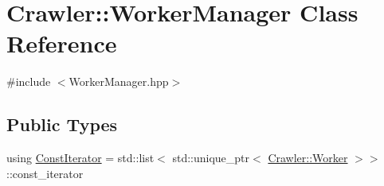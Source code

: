 \hypertarget{class_crawler_1_1_worker_manager}{}\section{Crawler\+:\+:Worker\+Manager Class Reference}
\label{class_crawler_1_1_worker_manager}


{\ttfamily \#include $<$Worker\+Manager.\+hpp$>$}

\subsection*{Public Types}
\begin{DoxyCompactItemize}
\item 
using \hyperlink{class_crawler_1_1_worker_manager_a5160dd76c74ca0275a642b6d1d6d08bc}{Const\+Iterator} = std\+::list$<$ std\+::unique\+\_\+ptr$<$ \hyperlink{class_crawler_1_1_worker}{Crawler\+::\+Worker} $>$$>$\+::const\+\_\+iterator
\end{DoxyCompactItemize}

